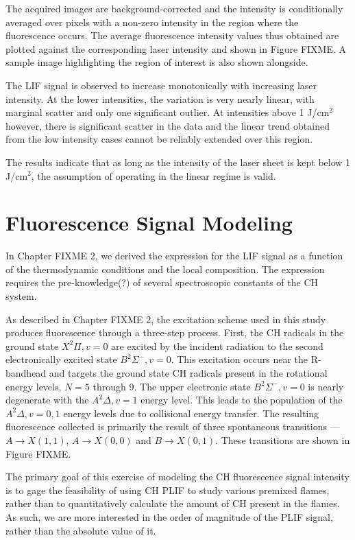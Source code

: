 The acquired images are background-corrected and the intensity is conditionally averaged over pixels with a non-zero intensity in the region where the fluorescence occurs.
The average fluorescence intensity values thus obtained are plotted against the corresponding laser intensity and shown in Figure FIXME.
A sample image highlighting the region of interest is also shown alongside.

The LIF signal is observed to increase monotonically with increasing laser intensity.
At the lower intensities, the variation is very nearly linear, with marginal scatter and only one significant outlier.
At intensities above 1 J/cm\(^2\) however, there is significant scatter in the data and the linear trend obtained from the low intensity cases cannot be reliably extended over this region.

The results indicate that as long as the intensity of the laser sheet is kept below 1 J/cm\(^2\), the assumption of operating in the linear regime is valid.

\section{Fluorescence Signal Modeling}

In Chapter FIXME 2, we derived the expression for the LIF signal as a function of the thermodynamic conditions and the local composition.
The expression requires the pre-knowledge(?) of several spectroscopic constants of the CH system.



As described in Chapter FIXME 2, the excitation scheme used in this study produces fluorescence through a three-step process.
First, the CH radicals in the ground state \(X^2\Pi, v=0\) are excited by the incident radiation to the second electronically excited state \(B^2\Sigma^-, v=0\).
This excitation occurs near the R-bandhead and targets the ground state CH radicals present in the rotational energy levels, \(N=5\) through 9.
The upper electronic state \(B^2\Sigma^-, v=0\) is nearly degenerate with the \(A^2\Delta, v=1\) energy level.
This leads to the population of the \(A^2\Delta, v=0,1\) energy levels due to collisional energy transfer.
The resulting fluorescence collected is primarily the result of three spontaneous transitions --- \(A\rightarrow X(1,1)\), \(A\rightarrow X(0,0)\) and \(B\rightarrow X(0,1)\).
These transitions are shown in Figure FIXME.

The primary goal of this exercise of modeling the CH fluorescence signal intensity is to gage the feasibility of using CH PLIF to study various premixed flames, rather than to quantitatively calculate the amount of CH present in the flames.
As such, we are more interested in the order of magnitude of the PLIF signal, rather than the absolute value of it.

